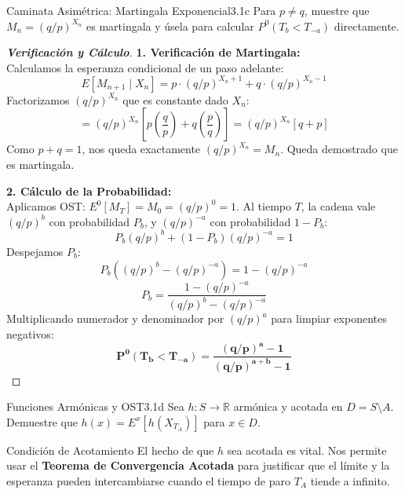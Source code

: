 \documentclass[10pt,a4paper]{article}
\begin{document}
\newpage

\begin{ejercicio}{Caminata Asimétrica: Martingala Exponencial}{3.1c}
    Para $p \neq q$, muestre que $M_n = (q/p)^{X_n}$ es martingala y úsela para calcular $P^0(T_b < T_{-a})$ directamente.
\end{ejercicio}

\begin{proof}[\textbf{Verificación y Cálculo}]
    \textbf{1. Verificación de Martingala:} \\
    Calculamos la esperanza condicional de un paso adelante:
    \[ E[M_{n+1} \mid X_n] = p \cdot (q/p)^{X_n+1} + q \cdot (q/p)^{X_n-1} \]
    Factorizamos $(q/p)^{X_n}$ que es constante dado $X_n$:
    \[ = (q/p)^{X_n} \left[ p\left(\frac{q}{p}\right) + q\left(\frac{p}{q}\right) \right] = (q/p)^{X_n} [q + p] \]
    Como $p+q=1$, nos queda exactamente $(q/p)^{X_n} = M_n$. Queda demostrado que es martingala.

    \vspace{3mm}
    \textbf{2. Cálculo de la Probabilidad:} \\
    Aplicamos OST: $E^0[M_T] = M_0 = (q/p)^0 = 1$.
    Al tiempo $T$, la cadena vale $(q/p)^b$ con probabilidad $P_b$, y $(q/p)^{-a}$ con probabilidad $1 - P_b$:
    \[ P_b(q/p)^b + (1 - P_b)(q/p)^{-a} = 1 \]
    Despejamos $P_b$:
    \[ P_b\left( (q/p)^b - (q/p)^{-a} \right) = 1 - (q/p)^{-a} \]
    \[ P_b = \frac{1 - (q/p)^{-a}}{(q/p)^b - (q/p)^{-a}} \]
    Multiplicando numerador y denominador por $(q/p)^a$ para limpiar exponentes negativos:
    \[ \mathbf{P^0(T_b < T_{-a}) = \frac{(q/p)^a - 1}{(q/p)^{a+b} - 1}} \]

\end{proof}

\newpage

\begin{ejercicio}{Funciones Armónicas y OST}{3.1d}
    Sea $h : S \to \mathbb{R}$ armónica y acotada en $D = S \setminus A$. Demuestre que $h(x) = E^x[h(X_{T_A})]$ para $x \in D$.
\end{ejercicio}

\begin{alerta}{Condición de Acotamiento}
    El hecho de que $h$ sea acotada es vital. Nos permite usar el \textbf{Teorema de Convergencia Acotada} para justificar que el límite y la esperanza pueden intercambiarse cuando el tiempo de paro $T_A$ tiende a infinito.
\end{alerta}
\end{document}
